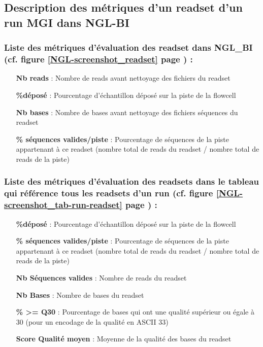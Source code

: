 

\newpage
\subsection*{Description des métriques d'un readset d'un run MGI dans NGL-BI}
\label{anexes3}
\subsubsection*{Liste des métriques d'évaluation des readset dans NGL\_BI (cf. figure \ref{NGL-screenshot_readset} page \pageref{NGL-screenshot_readset}) : }
\begin{itemize}
    \item[\textbf{Nb reads} :] Nombre de reads avant nettoyage des fichiers du readset
    \item[\textbf{\%déposé} :] Pourcentage d'échantillon déposé sur la piste de la flowcell
    \item[\textbf{Nb bases} :] Nombre de bases avant nettoyage des fichiers séquences du readset
    \item[\textbf{\% séquences valides/piste} :] Pourcentage de séquences de la piste appartenant à ce readset (nombre total de reads du readset / nombre total de reads de la piste)
\end{itemize}

\subsubsection*{Liste des métriques d'évaluation des readsets dans le tableau qui référence tous les readsets d'un run (cf. figure \ref{NGL-screenshot_tab-run-readset} page \pageref{NGL-screenshot_tab-run-readset}) :}
\begin{itemize}
    \item[\textbf{\%déposé} :] Pourcentage d'échantillon déposé sur la piste de la flowcell
    \item[\textbf{\% séquences valides/piste} :] Pourcentage de séquences de la piste appartenant à ce readset (nombre total de reads du readset / nombre total de reads de la piste)
    \item[\textbf{Nb Séquences valides} :] Nombre de reads du readset
    \item[\textbf{Nb Bases} :] Nombre de bases du readset
    \item[\textbf{\% >= Q30} :] Pourcentage de bases qui ont une qualité supérieur ou égale à 30 (pour un encodage de la qualité en ASCII 33)
    \item[\textbf{Score Qualité moyen} :] Moyenne de la qualité des bases du readset
\end{itemize}


